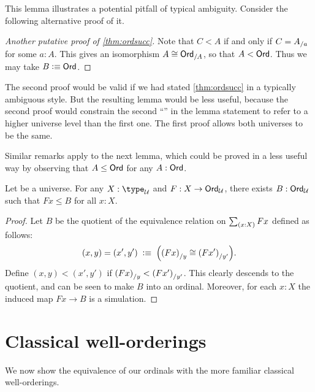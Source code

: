 This lemma illustrates a potential pitfall of typical ambiguity.
Consider the following alternative proof of it.

\begin{proof}[Another putative proof of \autoref{thm:ordsucc}]
  Note that $C<A$ if and only if $C={A}_{/a}$ for some $a:A$.
  This gives an isomorphism $A \cong {\ensuremath{\mathsf{Ord}}}_{/A}$, so that $A<\mathsf{Ord}$.
  Thus we may take $B\vcentcolon\equiv\mathsf{Ord}$.
\end{proof}

The second proof would be valid if we had stated \autoref{thm:ordsucc} in a typically ambiguous style.
But the resulting lemma would be less useful, because the second proof would constrain the second ``\ord'' in the lemma statement to refer to a higher universe level than the first one.
The first proof allows both universes to be the same.

Similar remarks apply to the next lemma, which could be proved in a less useful way by observing that $A\le \mathsf{Ord}$ for any $A:\mathsf{Ord}$.

\begin{lem}\label{thm:ordunion}
  Let \bbU be a universe.
  For any $X:\type_\bbU$ and $F:X\to \mathsf{Ord}_\mathcal{U}$, there exists $B:\mathsf{Ord}_\mathcal{U}$ such that $Fx\le B$ for all $x:X$.
\end{lem}
\begin{proof}
  Let $B$ be the quotient of the equivalence relation on $\sm{x:X} Fx$ defined as follows:
  \[ (x,y)  = (x',y')
  \;\vcentcolon\equiv\;
  \Big({(Fx)}_{/y} \cong {(Fx')}_{/y'}\Big).
  \]
  Define $(x,y)<(x',y')$ if ${(Fx)}_{/y} < {(Fx')}_{/y'}$.
  This clearly descends to the quotient, and can be seen to make $B$ into an ordinal.
  Moreover, for each $x:X$ the induced map $Fx\to B$ is a simulation.
\end{proof}



\section{Classical well-orderings}
\label{sec:wellorderings}

We now show the equivalence of our ordinals with the more familiar classical well-orderings.

